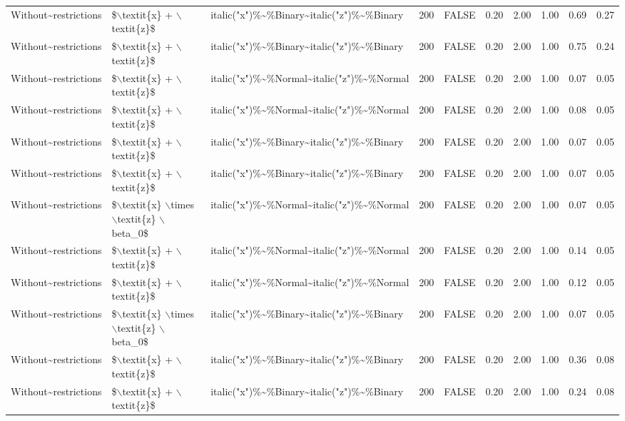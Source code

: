 \begin{table}[ht]
\begin{tabular}{lllrlrrrrr}
  Without\~{}restrictions & \$$\backslash$textit\{x\} + $\backslash$textit\{z\}\$ & italic("x")\%\~{}\%Binary\~{}italic("z")\%\~{}\%Binary & 200 & FALSE & 0.20 & 2.00 & 1.00 & 0.69 & 0.27 \\ 
  Without\~{}restrictions & \$$\backslash$textit\{x\} + $\backslash$textit\{z\}\$ & italic("x")\%\~{}\%Binary\~{}italic("z")\%\~{}\%Binary & 200 & FALSE & 0.20 & 2.00 & 1.00 & 0.75 & 0.24 \\ 
  Without\~{}restrictions & \$$\backslash$textit\{x\} + $\backslash$textit\{z\}\$ & italic("x")\%\~{}\%Normal\~{}italic("z")\%\~{}\%Normal & 200 & FALSE & 0.20 & 2.00 & 1.00 & 0.07 & 0.05 \\ 
  Without\~{}restrictions & \$$\backslash$textit\{x\} + $\backslash$textit\{z\}\$ & italic("x")\%\~{}\%Normal\~{}italic("z")\%\~{}\%Normal & 200 & FALSE & 0.20 & 2.00 & 1.00 & 0.08 & 0.05 \\ 
  Without\~{}restrictions & \$$\backslash$textit\{x\} + $\backslash$textit\{z\}\$ & italic("x")\%\~{}\%Binary\~{}italic("z")\%\~{}\%Binary & 200 & FALSE & 0.20 & 2.00 & 1.00 & 0.07 & 0.05 \\ 
  Without\~{}restrictions & \$$\backslash$textit\{x\} + $\backslash$textit\{z\}\$ & italic("x")\%\~{}\%Binary\~{}italic("z")\%\~{}\%Binary & 200 & FALSE & 0.20 & 2.00 & 1.00 & 0.07 & 0.05 \\ 
  Without\~{}restrictions & \$$\backslash$textit\{x\} $\backslash$times $\backslash$textit\{z\} $\backslash$beta\_0\$ & italic("x")\%\~{}\%Normal\~{}italic("z")\%\~{}\%Normal & 200 & FALSE & 0.20 & 2.00 & 1.00 & 0.07 & 0.05 \\ 
  Without\~{}restrictions & \$$\backslash$textit\{x\} + $\backslash$textit\{z\}\$ & italic("x")\%\~{}\%Normal\~{}italic("z")\%\~{}\%Normal & 200 & FALSE & 0.20 & 2.00 & 1.00 & 0.14 & 0.05 \\ 
  Without\~{}restrictions & \$$\backslash$textit\{x\} + $\backslash$textit\{z\}\$ & italic("x")\%\~{}\%Normal\~{}italic("z")\%\~{}\%Normal & 200 & FALSE & 0.20 & 2.00 & 1.00 & 0.12 & 0.05 \\ 
  Without\~{}restrictions & \$$\backslash$textit\{x\} $\backslash$times $\backslash$textit\{z\} $\backslash$beta\_0\$ & italic("x")\%\~{}\%Binary\~{}italic("z")\%\~{}\%Binary & 200 & FALSE & 0.20 & 2.00 & 1.00 & 0.07 & 0.05 \\ 
  Without\~{}restrictions & \$$\backslash$textit\{x\} + $\backslash$textit\{z\}\$ & italic("x")\%\~{}\%Binary\~{}italic("z")\%\~{}\%Binary & 200 & FALSE & 0.20 & 2.00 & 1.00 & 0.36 & 0.08 \\ 
  Without\~{}restrictions & \$$\backslash$textit\{x\} + $\backslash$textit\{z\}\$ & italic("x")\%\~{}\%Binary\~{}italic("z")\%\~{}\%Binary & 200 & FALSE & 0.20 & 2.00 & 1.00 & 0.24 & 0.08 \\ 
   \hline
\end{tabular}
\end{table}
